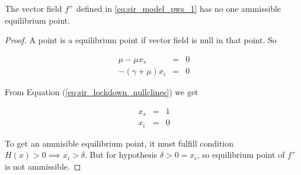 \begin{lemma}
\label{th:equilibria_lockdown}
The vector field $f^+$ defined in \ref{eq:sir_model_pws_1} has no one ammissible equilibrium point.
\end{lemma}

\begin{proof}
A point is a equilibrium point if vector field is null in that point. So

\begin{equation}
\label{eq:sir_lockdown_nullclines}
    \begin{array}{ccc}
        \mu - \mu x_s &=& 0  \\
        - (\gamma + \mu)x_i &=& 0 
    \end{array}
\end{equation}

From Equation (\ref{eq:sir_lockdown_nullclines}) we get

\begin{equation}
\label{eq:sir_lockdown_nullclines_demonstation}
    \begin{array}{ccc}
        x_s &=& 1  \\
        x_i &=& 0 
    \end{array}
\end{equation}

To get an ammisible equilibrium point, it must fulfill condition $H(x) > 0 \implies x_i > \delta$.
But for hypothesis $\delta > 0 = x_i$, so equilibrium point of $f^+$ is not ammissible.
\end{proof}